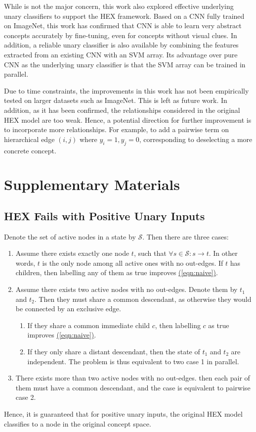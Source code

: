 \documentclass[11pt,a4paper]{book}
\begin{document}
While is not the major concern, this work also explored effective underlying unary classifiers to support the HEX framework. 
Based on a CNN \cite{krizhevsky2012imagenet} fully trained on ImageNet, this work has confirmed that CNN is able to learn very abstract concepts accurately by fine-tuning, even for concepts without visual clues. In addition, a reliable unary classifier is also available by combining the features extracted from an existing CNN with an SVM array. Its advantage over pure CNN as the underlying unary classifier is that the SVM array can be trained in parallel.

Due to time constraints, the improvements in this work has not been empirically tested on larger datasets such as ImageNet. This is left as future work. In addition, as it has been confirmed, the relationships considered in the original HEX model are too weak. Hence, a potential direction for further improvement is to incorporate more relationships. For example, to add a pairwise term on hierarchical edge $(i,j)$ where $y_i=1,y_j=0$, corresponding to deselecting a more concrete concept.

\appendix
\chapter{Supplementary Materials}
\section{HEX Fails with Positive Unary Inputs}
\label{sec:fail}

Denote the set of active nodes in a state by $\mathcal{S}$. Then there are three cases:
\begin{enumerate}
\item Assume there exists exactly one node $t$, such that $\forall s\in\mathcal{S}:s\rightarrow t$. In other words, $t$ is the only node among all active ones with no out-edges. If $t$ has children, then labelling any of them as true improves \hyperref[eqn:naive]{(\ref{eqn:naive})}.
\item Assume there exists two active nodes with no out-edges. Denote them by $t_1$ and $t_2$. Then they must share a common descendant, as otherwise they would be connected by an exclusive edge.
\begin{enumerate}
\item If they share a common immediate child $c$, then labelling $c$ as true improves \hyperref[eqn:naive]{(\ref{eqn:naive})}.
\item If they only share a distant descendant, then the state of $t_1$ and $t_2$ are independent. The problem is thus equivalent to two case 1 in parallel.
\end{enumerate}
\item There exists more than two active nodes with no out-edges. then each pair of them must have a common descendant, and the case is equivalent to pairwise case 2.
\end{enumerate}
Hence, it is guaranteed that for positive unary inputs, the original HEX model classifies to a node in the original concept space.
\end{document}
